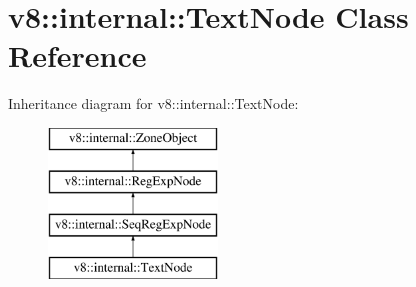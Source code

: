 \hypertarget{classv8_1_1internal_1_1_text_node}{}\section{v8\+:\+:internal\+:\+:Text\+Node Class Reference}
\label{classv8_1_1internal_1_1_text_node}
Inheritance diagram for v8\+:\+:internal\+:\+:Text\+Node\+:\begin{figure}[H]
\begin{center}
\leavevmode
\includegraphics[height=4.000000cm]{classv8_1_1internal_1_1_text_node}
\end{center}
\end{figure}
